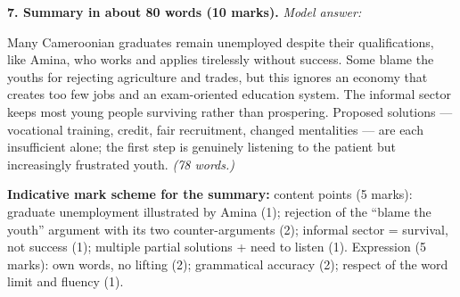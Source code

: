 \documentclass[11pt]{article}
\begin{document}
\begin{corrige}
\textbf{7. Summary in about 80 words (10 marks).} \emph{Model answer:}

Many Cameroonian graduates remain unemployed despite their qualifications, like Amina, who works and applies tirelessly without success. Some blame the youths for rejecting agriculture and trades, but this ignores an economy that creates too few jobs and an exam-oriented education system. The informal sector keeps most young people surviving rather than prospering. Proposed solutions — vocational training, credit, fair recruitment, changed mentalities — are each insufficient alone; the first step is genuinely listening to the patient but increasingly frustrated youth. \emph{(78 words.)}

\textbf{Indicative mark scheme for the summary:} content points (5 marks): graduate unemployment illustrated by Amina (1); rejection of the ``blame the youth'' argument with its two counter-arguments (2); informal sector = survival, not success (1); multiple partial solutions + need to listen (1). Expression (5 marks): own words, no lifting (2); grammatical accuracy (2); respect of the word limit and fluency (1).
\end{corrige}
\end{document}
